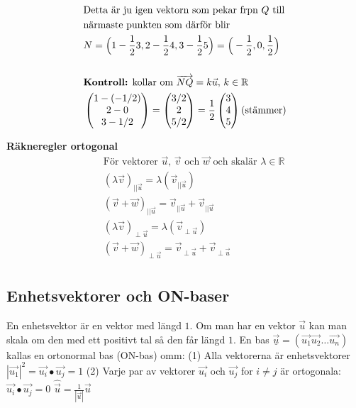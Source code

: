 \begin{multicols}{2}
\begin{align*}
  &\text{Detta är ju igen vektorn som pekar frpn $Q$ till} \\
  &\text{närmaste punkten som därför blir} \\
  &N = \Big( 1-\frac{1}{2}3, 2-\frac{1}{2}4, 3-\frac{1}{2}5 \Big)
  = \Big( -\frac{1}{2},0,\frac{1}{2} \Big) \\
  &\\
  &\text{\textbf{Kontroll:} kollar om } \overrightarrow{NQ} = k\vec{u}, \, k\in\mathbb{R} \\
  &\begin{pmatrix} 1-(-1/2) \\ 2-0 \\ 3-1/2 \end{pmatrix} =
  \begin{pmatrix} 3/2 \\ 2 \\ 5/2 \end{pmatrix} =
  \frac{1}{2}\begin{pmatrix} 3 \\ 4 \\ 5 \end{pmatrix} \text{(stämmer)} \\
\end{align*}


\textbf{Räkneregler ortogonal}
\begin{align*} 
  &\quad  \text{För vektorer $\vec{u}$, $\vec{v}$ och $\vec{w}$ och skalär $\lambda\in\mathbb{R}$} \\
  &\quad  {(\lambda\vec{v})}_{||\vec{u}}=\lambda(\vec{v}_{||\vec{u}}) \\
  &\quad  {(\vec{v}+\vec{w})}_{||\vec{u}} = \vec{v}_{||\vec{u}} + \vec{v}_{||\vec{u}} \\
  &\quad  {(\lambda\vec{v})}_{\perp{\vec{u}}} = \lambda(\vec{v}_{\perp\vec{u}}) \\
  &\quad  {(\vec{v}+\vec{w})}_{\perp{\vec{u}}} = \vec{v}_{\perp{\vec{u}}} + \vec{v}_{\perp{\vec{u}}} \\
\end{align*}


\subsection{Enhetsvektorer och ON-baser}
En enhetsvektor är en vektor med längd $1$.
Om man har en vektor $\vec{u}$ kan man skala om
den med ett positivt tal så den får längd $1$.
En bas $\underline{\vec{u}} = (\vec{u_1} \vec{u_2} \ldots \vec{u_n})$
kallas en ortonormal bas (ON-bas) omm: \newline
(1)  Alla vektorerna är enhetsvektorer
$|\vec{u_1}|^2 = \vec{u_i}\bullet\vec{u_j} = 1$
(2)  Varje par av vektorer $\vec{u_i}$ och $\vec{u_j}$ for $i\neq{j}$ är ortogonala:
$\vec{u_i}\bullet\vec{u_j}=0$
$\hat{\vec{u}} = \frac{1}{|\vec{u}|}\vec{u}$


\end{multicols}
